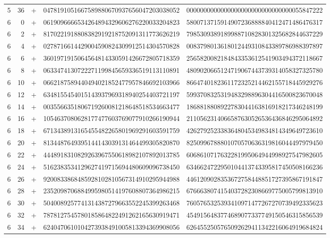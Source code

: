 \begin{longtable}{rrrll}
5 & 36 & + & 0478191051667589880670937656047203038052 & 0000000000000000000000000000000055847222 \\
6 & 0 & + & 0619096666534264894329606276220033204823 & 5800713715914907236888840412471486476317 \\
6 & 2 & + & 8170221918808382919218752091311773626219 & 7985309389189988710828301325682844637229 \\
6 & 4 & + & 0278716614429004590824309912514304570828 & 0083798013618012449310843389786988397897 \\
6 & 6 & + & 3601971915064564814330591426672805718359 & 2565820082184843353612541903494372118667 \\
6 & 8 & + & 0633474130722271199845659336519113110891 & 4809020665124719067443739314058327325780 \\
6 & 10 & + & 0662187589440494021852477957846692103966 & 8664740182361172325214462155718445929276 \\
6 & 12 & + & 6348155454015143937969318940254403721197 & 5993708325319483298896304416500823670048 \\
6 & 14 & + & 0035566351806719260081218648518534663477 & 1868818808922783044163816918217346248199 \\
6 & 16 & + & 1054637080628177477603769077910266190944 & 2110562314066587630526536436846295064892 \\
6 & 18 & + & 6713438913165455482265801969291603591759 & 4262792523383648045349834814349649723610 \\
6 & 20 & + & 8134487649395144143039131464499305820870 & 8250996788801070570636319816044497979450 \\
6 & 22 & + & 4448918310829263967550618982107892013785 & 6068610717632281995064944998927547982605 \\
6 & 24 & + & 5162383534129627419715694480609096738450 & 6346624722950104413743395817450508166236 \\
6 & 26 & + & 9200833868485928102810567314910295944988 & 4461209028353672758448851727395867191847 \\
6 & 28 & + & 2352098706884995980514197608807364986215 & 6766638074154037282308669775005799813910 \\
6 & 30 & + & 5040089257741314387279663552245399263468 & 7605765325393410971477267270739492335623 \\
6 & 32 & + & 7878127545780185864822491262165630919471 & 4549156483774689077337749150546315856539 \\
6 & 34 & + & 6240470610104273938491005813394369908056 & 6264552505765092629411342216064919684824 \\

\end{longtable}
